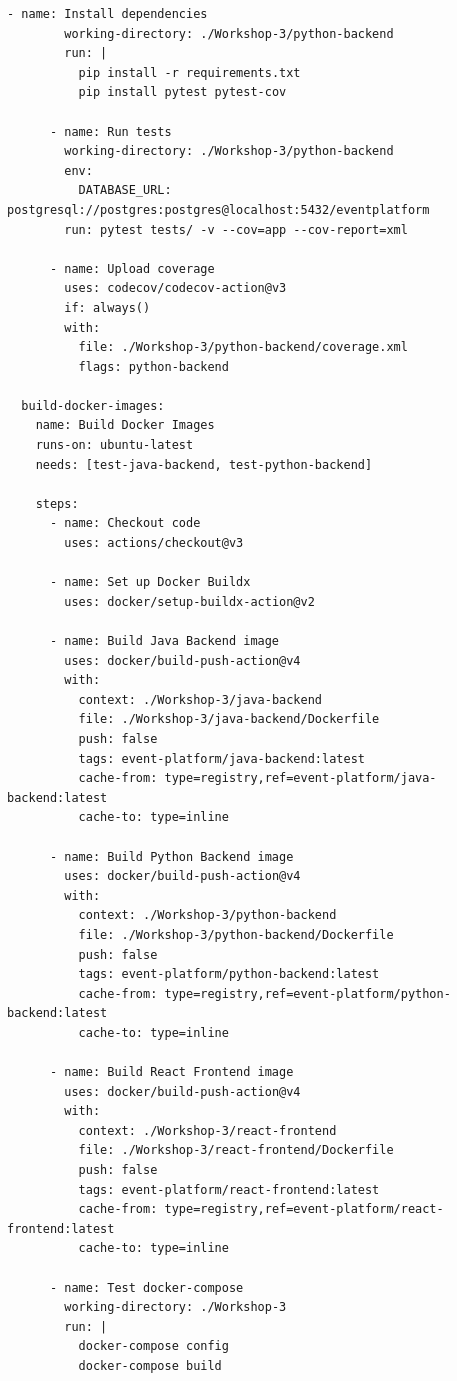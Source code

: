 \documentclass[12pt,a4paper]{article}
\begin{document}
\begin{lstlisting}[style=yaml, caption={GitHub Actions CI/CD Workflow}, label={lst:github-actions}]
      - name: Install dependencies
        working-directory: ./Workshop-3/python-backend
        run: |
          pip install -r requirements.txt
          pip install pytest pytest-cov

      - name: Run tests
        working-directory: ./Workshop-3/python-backend
        env:
          DATABASE_URL: postgresql://postgres:postgres@localhost:5432/eventplatform
        run: pytest tests/ -v --cov=app --cov-report=xml

      - name: Upload coverage
        uses: codecov/codecov-action@v3
        if: always()
        with:
          file: ./Workshop-3/python-backend/coverage.xml
          flags: python-backend

  build-docker-images:
    name: Build Docker Images
    runs-on: ubuntu-latest
    needs: [test-java-backend, test-python-backend]
    
    steps:
      - name: Checkout code
        uses: actions/checkout@v3

      - name: Set up Docker Buildx
        uses: docker/setup-buildx-action@v2

      - name: Build Java Backend image
        uses: docker/build-push-action@v4
        with:
          context: ./Workshop-3/java-backend
          file: ./Workshop-3/java-backend/Dockerfile
          push: false
          tags: event-platform/java-backend:latest
          cache-from: type=registry,ref=event-platform/java-backend:latest
          cache-to: type=inline

      - name: Build Python Backend image
        uses: docker/build-push-action@v4
        with:
          context: ./Workshop-3/python-backend
          file: ./Workshop-3/python-backend/Dockerfile
          push: false
          tags: event-platform/python-backend:latest
          cache-from: type=registry,ref=event-platform/python-backend:latest
          cache-to: type=inline

      - name: Build React Frontend image
        uses: docker/build-push-action@v4
        with:
          context: ./Workshop-3/react-frontend
          file: ./Workshop-3/react-frontend/Dockerfile
          push: false
          tags: event-platform/react-frontend:latest
          cache-from: type=registry,ref=event-platform/react-frontend:latest
          cache-to: type=inline

      - name: Test docker-compose
        working-directory: ./Workshop-3
        run: |
          docker-compose config
          docker-compose build


\end{lstlisting}
\end{document}
